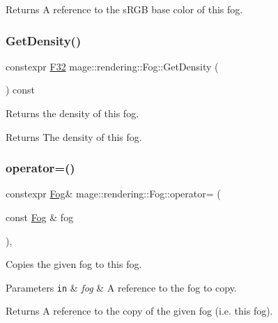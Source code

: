 \begin{DoxyReturn}{Returns}
A reference to the s\+R\+GB base color of this fog. 
\end{DoxyReturn}
\hypertarget{classmage_1_1rendering_1_1_fog_ac99a5479a39027723807296c49fdfbc8}{}\label{classmage_1_1rendering_1_1_fog_ac99a5479a39027723807296c49fdfbc8} 
\subsubsection{\texorpdfstring{Get\+Density()}{GetDensity()}}
{\footnotesize\ttfamily constexpr \hyperlink{namespacemage_aa97e833b45f06d60a0a9c4fc22ae02c0}{F32} mage\+::rendering\+::\+Fog\+::\+Get\+Density (\begin{DoxyParamCaption}{ }\end{DoxyParamCaption}) const\hspace{0.3cm}{\ttfamily [noexcept]}}

Returns the density of this fog.

\begin{DoxyReturn}{Returns}
The density of this fog. 
\end{DoxyReturn}
\hypertarget{classmage_1_1rendering_1_1_fog_a6197ad3df06e461c7cb2f5028f8cd901}{}\label{classmage_1_1rendering_1_1_fog_a6197ad3df06e461c7cb2f5028f8cd901} 
\subsubsection{\texorpdfstring{operator=()}{operator=()}\hspace{0.1cm}{\footnotesize\ttfamily [1/2]}}
{\footnotesize\ttfamily constexpr \hyperlink{classmage_1_1rendering_1_1_fog}{Fog}\& mage\+::rendering\+::\+Fog\+::operator= (\begin{DoxyParamCaption}\item[{const \hyperlink{classmage_1_1rendering_1_1_fog}{Fog} \&}]{fog }\end{DoxyParamCaption})\hspace{0.3cm}{\ttfamily [default]}, {\ttfamily [noexcept]}}

Copies the given fog to this fog.


\begin{DoxyParams}[1]{Parameters}
\mbox{\tt in}  & {\em fog} & A reference to the fog to copy. \\
\hline
\end{DoxyParams}
\begin{DoxyReturn}{Returns}
A reference to the copy of the given fog (i.\+e. this fog). 
\end{DoxyReturn}
\hypertarget{classmage_1_1rendering_1_1_fog_ae0b197b983b73f78782fecfc491ddd1c}{}\label{classmage_1_1rendering_1_1_fog_ae0b197b983b73f78782fecfc491ddd1c} 
